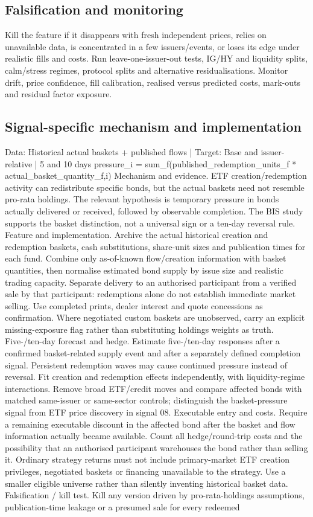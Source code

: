 \documentclass[10pt]{article}
\begin{document}
\subsection{Falsification and monitoring}
Kill the feature if it disappears with fresh independent prices, relies on unavailable data, is concentrated in a few issuers/events, or loses its edge under realistic fills and costs. Run leave-one-issuer-out tests, IG/HY and liquidity splits, calm/stress regimes, protocol splits and alternative residualisations. Monitor drift, price confidence, fill calibration, realised versus predicted costs, mark-outs and residual factor exposure.
\subsection{Signal-specific mechanism and implementation}
Data: Historical actual baskets + published flows  |  Target: Base and issuer-relative  |  5 and 10 days pressure\_i = sum\_f(published\_redemption\_units\_f * actual\_basket\_quantity\_f,i) Mechanism and evidence.  ETF creation/redemption activity can redistribute specific bonds, but the actual baskets need not resemble pro-rata holdings. The relevant hypothesis is temporary pressure in bonds actually delivered or received, followed by observable completion. The BIS study supports the basket distinction, not a universal sign or a ten-day reversal rule. Feature and implementation.  Archive the actual historical creation and redemption baskets, cash substitutions, share-unit sizes and publication times for each fund. Combine only as-of-known flow/creation information with basket quantities, then normalise estimated bond supply by issue size and realistic trading capacity. Separate delivery to an authorised participant from a verified sale by that participant: redemptions alone do not establish immediate market selling. Use completed prints, dealer interest and quote concessions as confirmation. Where negotiated custom baskets are unobserved, carry an explicit missing-exposure flag rather than substituting holdings weights as truth. Five-/ten-day forecast and hedge.  Estimate five-/ten-day responses after a confirmed basket-related supply event and after a separately defined completion signal. Persistent redemption waves may cause continued pressure instead of reversal. Fit creation and redemption effects independently, with liquidity-regime interactions. Remove broad ETF/credit moves and compare affected bonds with matched same-issuer or same-sector controls; distinguish the basket-pressure signal from ETF price discovery in signal 08. Executable entry and costs.  Require a remaining executable discount in the affected bond after the basket and flow information actually became available. Count all hedge/round-trip costs and the possibility that an authorised participant warehouses the bond rather than selling it. Ordinary strategy returns must not include primary-market ETF creation privileges, negotiated baskets or financing unavailable to the strategy. Use a smaller eligible universe rather than silently inventing historical basket data. Falsification / kill test.  Kill any version driven by pro-rata-holdings assumptions, publication-time leakage or a presumed sale for every redeemed 
\end{document}
